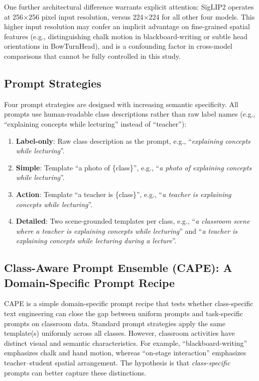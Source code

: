 \documentclass[electronics,article,submit,pdftex,moreauthors]{Definitions/mdpi}
\begin{document}
One further architectural difference warrants explicit attention: SigLIP2 operates at 256$\times$256 pixel input resolution, versus 224$\times$224 for all other four models. This higher input resolution may confer an implicit advantage on fine-grained spatial features (e.g., distinguishing chalk motion in blackboard-writing or subtle head orientations in BowTurnHead), and is a confounding factor in cross-model comparisons that cannot be fully controlled in this study.

\subsection{Prompt Strategies}
\label{sec:prompts}

Four prompt strategies are designed with increasing semantic specificity.
All prompts use human-readable class descriptions rather than raw label names (e.g., ``explaining concepts while lecturing'' instead of ``teacher''):

\begin{enumerate}
    \item \textbf{Label-only}: Raw class description as the prompt, e.g., ``\textit{explaining concepts while lecturing}''.
    \item \textbf{Simple}: Template ``a photo of \{class\}'', e.g., ``\textit{a photo of explaining concepts while lecturing}''.
    \item \textbf{Action}: Template ``a teacher is \{class\}'', e.g., ``\textit{a teacher is explaining concepts while lecturing}''.
    \item \textbf{Detailed}: Two scene-grounded templates per class, e.g., ``\textit{a classroom scene where a teacher is explaining concepts while lecturing}'' and ``\textit{a teacher is explaining concepts while lecturing during a lecture}''.
\end{enumerate}

\subsection{Class-Aware Prompt Ensemble (CAPE): A Domain-Specific Prompt Recipe}
\label{sec:cape}

CAPE is a simple domain-specific prompt recipe that tests whether class-specific text engineering can close the gap between uniform prompts and task-specific prompts on classroom data.
Standard prompt strategies apply the same template(s) uniformly across all classes.
However, classroom activities have distinct visual and semantic characteristics.
For example, ``blackboard-writing'' emphasizes chalk and hand motion, whereas ``on-stage interaction'' emphasizes teacher--student spatial arrangement.
The hypothesis is that \emph{class-specific} prompts can better capture these distinctions.
\end{document}
